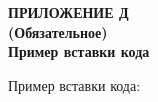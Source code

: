 \clearpage
{}%
\par

\normalsize
\begin{center}
  \textbf{ПРИЛОЖЕНИЕ Д} \\
  \textbf{(Обязательное)} \\
  \textbf{Пример вставки кода}
\end{center}

Пример вставки кода:

% 


\pdfpagewidth=210mm
\pdfpageheight=297mm
